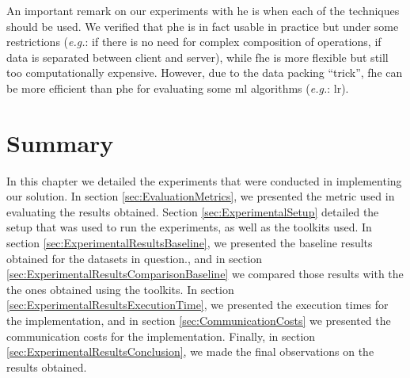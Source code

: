 An important remark on our experiments with \ac{he} is when each of the techniques should be used. We verified that \ac{phe} is in fact usable in practice but under some restrictions (\textit{e.g.}: if there is no need for complex composition of operations, if data is separated between client and server), while \ac{fhe} is more flexible but still too computationally expensive. However, due to the data packing ``trick'', \ac{fhe} can be more efficient than \ac{phe} for evaluating some \ac{ml} algorithms (\textit{e.g.}: \ac{lr}).





\section{Summary}
\label{sec:SummaryEvaluation}


In this chapter we detailed the experiments that were conducted in implementing our solution. In section \ref{sec:EvaluationMetrics}, we presented the metric used in evaluating the results obtained.
Section \ref{sec:ExperimentalSetup} detailed the setup that was used to run the experiments, as well as the toolkits used.
In section \ref{sec:ExperimentalResultsBaseline}, we presented the baseline results obtained for the datasets in question., and in section \ref{sec:ExperimentalResultsComparisonBaseline} we compared those results with the the ones obtained using the toolkits.
In section \ref{sec:ExperimentalResultsExecutionTime}, we presented the execution times for the implementation, and in section \ref{sec:CommunicationCosts} we presented the communication costs for the implementation.
Finally, in section \ref{sec:ExperimentalResultsConclusion}, we made the final observations on the results obtained.


